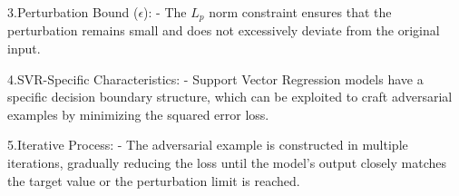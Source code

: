 3.Perturbation Bound ($\epsilon$):
   - The $L_p$ norm constraint ensures that the perturbation remains small and does not excessively deviate from the original input.

4.SVR-Specific Characteristics:
   - Support Vector Regression models have a specific decision boundary structure, which can be exploited to craft adversarial examples by minimizing the squared error loss.

5.Iterative Process:
   - The adversarial example is constructed in multiple iterations, gradually reducing the loss until the model's output closely matches the target value or the perturbation limit is reached.